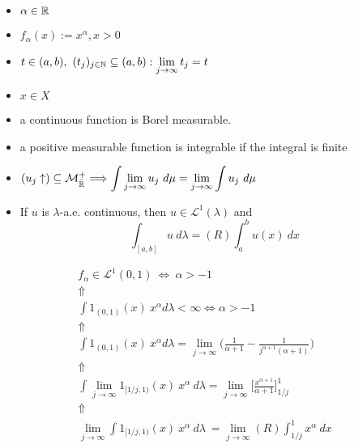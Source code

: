 \noindent\makebox[\linewidth]{\rule{\paperwidth}{0.4pt}}

\begin{minipage}[t]{0.46\textwidth}
\begin{given}
\begin{itemize}
\item \(\alpha \in \Bbb{R}\)
\item \(f_\alpha (x):= x^\alpha , x>0\) 

\end{itemize}
\end{given}

\begin{random}
\begin{itemize}
  \item \(\displaystyle t\in (a,b),\  (t_{j})_{j\in \Bbb{N}}\subseteq (a,b): \lim_{j\rightarrow \infty }t_{j}=t\)
 \item \( x \in X\)
\end{itemize}

\end{random}

\begin{tools}
\begin{itemize}
\item a continuous function is Borel measurable. 
\item a positive measurable function is integrable if the integral is finite 
\item \(\displaystyle
(u_{j}\uparrow )\subseteq \mathcal{M}_{\bar{\Bbb{R}}}^+ \Longrightarrow  \int  \lim_{j\rightarrow  \infty } u_{j}\  d\mu  = \lim_{j\rightarrow \infty } \int  u_{j}\  d\mu 
\)
\item If \(u\) is \(\lambda \)-a.e. continuous, then \(u\in \mathcal{L}^1(\lambda )\) and
\[
\int _{[a,b]} u\  d\lambda  = (R) \int _{a}^b u(x)\  dx
\]
\end{itemize}
\end{tools}

\end{minipage}
\begin{minipage}[t]{0.55\textwidth}
\vspace{-0.1in}
\begin{gather*}
f_\alpha \in \mathcal{L}^1(0,1)\  \Longleftrightarrow \  \alpha >-1 \\
\Uparrow  \\
\int 1_{(0,1)}(x)\  x^\alpha  d\lambda < \infty  \Longleftrightarrow  \alpha >-1 \\
\Uparrow  \\
\int 1_{(0,1)}(x)\  x^\alpha  d\lambda  = \lim_{j\rightarrow \infty } \bigg(\frac{1}{\alpha +1} - \frac{1}{j^{\alpha +1}(\alpha +1)}\bigg) \\
\Uparrow  \\
\int \lim_{j\rightarrow \infty } 1_{[1/j,1)}(x)\    x^\alpha \  d\lambda  =  \lim_{j\rightarrow \infty }\Big[\frac{x^{\alpha +1}}{\alpha +1}\Big]_{1/j}^{1} \\
\Uparrow  \\
\lim_{j\rightarrow \infty } \int  1_{[1/j,1)}(x)\  x^\alpha \ d\lambda \  = \lim_{j\rightarrow \infty }(R) \int _{1/j}^{1} x^\alpha \  dx
\end{gather*}
\end{minipage}

